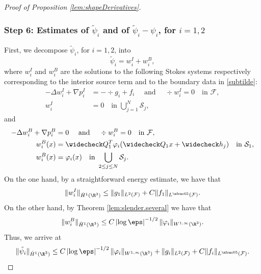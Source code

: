 \begin{proof}[Proof of Proposition \ref{lem:shapeDerivatives}]
\subsubsection*{Step 6: Estimates of $\tilde \psi_i$ and of $\tilde \psi_i - \psi_i$, for $i=1,2$}
First, we decompose $\tilde \psi_i$, for $i=1,2$, into
\[
\tilde \psi_i = w_i^I + w_i^B,\] where $ w_i^I $ and $ w_i^B$ are the solutions to the following Stokes systems respectively corresponding to the interior source term and to the boundary data in \eqref{subtilde}:
\begin{align*}
- \Delta w_i^I + \nabla p_i^I &= -\div g_i + f_i \quad \text{ and } \quad \div w_i^I = 0 \quad \text{in } \mathcal F, \\
w_i^I &= 0 \quad \text{in } \bigcup_{j=1}^N \mathcal S_j,
\end{align*}
and
\begin{align*}
- \Delta w_i^{B} + \nabla p_i^{B} &= 0 \quad \text{ and } \quad \div w_i^{B} = 0 \quad \text{in } \mathcal F, \\
w_i^{B}(x) &= \widecheck Q_1^T \varphi_i(\widecheck Q_1 x + \widecheck h_j)\quad \text{in } \mathcal S_1, \\
w_i^{B}(x) &= \varphi_i(x) \quad \text{in } \bigcup_{2 \leq j \leq N} \mathcal S_j.
\end{align*}
On the one hand, by a straightforward energy estimate, we have that
\begin{equation*}
\| w^I_i \|_{\dot H^1(\R^3)} \leq \|g_1\|_{L^2 (\mathcal F)} + C \|f_1\|_{L^{\sfrac 6 5 }(\mathcal F)}.
\end{equation*}
On the other hand, by Theorem \ref{lem:slender.several}
we have that
\begin{equation*}
\| w_i^{B} \|_{\dot H^1 (\R^3)} \leq C \left|\log \eps\right|^{-1/2}\| \varphi_i\|_{W^{1,\infty}(\R^3)}.
\end{equation*}
Thus, we arrive at
\begin{equation}
\label{midi2}
\|\tilde \psi_i\|_{\dot H^1(\R^3)} \leq C \left|\log \eps\right|^{-1/2}\| \varphi_i\|_{W^{1,\infty} (\R^3)} + \| g_i\|_{L^2(\mathcal F)} + C \|f_i\|_{L^{\sfrac 6 5 }(\mathcal F)}.
\end{equation}


\end{proof}
